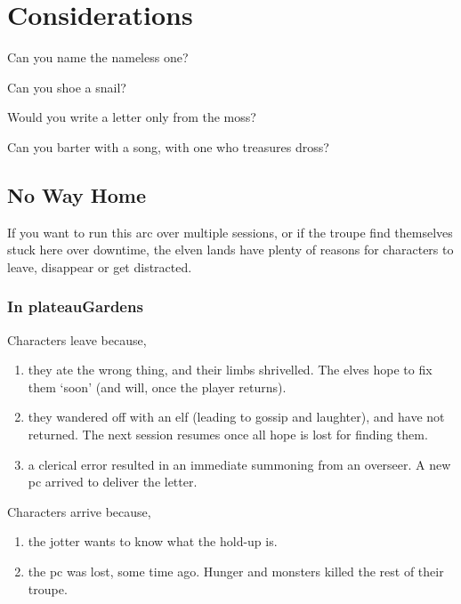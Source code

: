 \section{Considerations}

\begin{exampletext}
  Can you name the nameless one?

  Can you shoe a snail?

  Would you write a letter only from the moss?

  Can you barter with a song, with one who treasures dross?
\end{exampletext}

\begin{multicols}{2}

\subsection{No Way Home}

If you want to run this arc over multiple sessions, or if the troupe find themselves stuck here over \gls{downtime}, the elven lands have plenty of reasons for characters to leave, disappear or get distracted.

\subsubsection{In \gls{plateauGardens}}

Characters leave because,

\begin{enumerate}
  \item
  they ate the wrong thing, and their limbs shrivelled.
  The elves hope to fix them `soon' (and will, once the player returns).
  \item
  they wandered off with an elf (leading to gossip and laughter), and have not returned.
  The next session resumes once all hope is lost for finding them.
  \item
  a clerical error resulted in an immediate summoning from an overseer.
  A new \gls{pc} arrived to deliver the letter.
\end{enumerate}

Characters arrive because,

\begin{enumerate}
  \item
  the \gls{jotter} wants to know what the hold-up is.
  \item
  the \gls{pc} was lost, some time ago.
  Hunger and monsters killed the rest of their troupe.
\end{enumerate}


\end{multicols}
